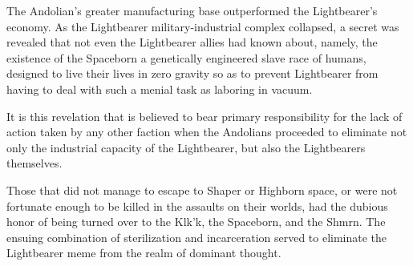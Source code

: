 The Andolian's greater manufacturing base outperformed the
Lightbearer's economy. As the Lightbearer military-industrial complex
collapsed, a secret was revealed that not even the Lightbearer allies
had known about, namely, the existence of the Spaceborn a genetically
engineered slave race of humans, designed to live their lives in zero
gravity so as to prevent Lightbearer from having to deal with such a
menial task as laboring in vacuum.

It is this revelation that is believed to bear primary responsibility
for the lack of action taken by any other faction when the Andolians
proceeded to eliminate not only the industrial capacity of the
Lightbearer, but also the Lightbearers themselves.

Those that did not manage to escape to Shaper or Highborn space, or
were not fortunate enough to be killed in the assaults on their
worlds, had the dubious honor of being turned over to the Klk'k, the
Spaceborn, and the Shmrn. The ensuing combination of sterilization and
incarceration served to eliminate the Lightbearer meme from the realm
of dominant thought.
